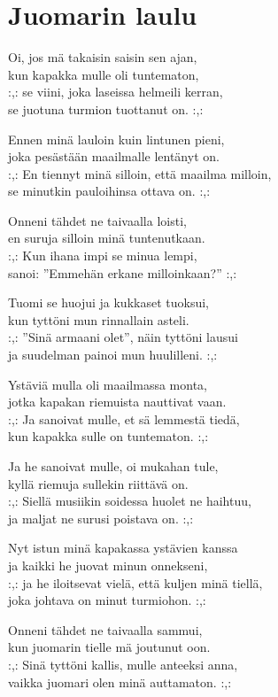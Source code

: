 \section{Juomarin laulu}

Oi, jos mä takaisin saisin sen ajan, \\
kun kapakka mulle oli tuntematon, \\
:,: se viini, joka laseissa helmeili kerran, \\
se juotuna turmion tuottanut on. :,:

Ennen minä lauloin kuin lintunen pieni, \\
joka pesästään maailmalle lentänyt on. \\
:,: En tiennyt minä silloin, että maailma milloin, \\
se minutkin pauloihinsa ottava on. :,:

Onneni tähdet ne taivaalla loisti, \\
en suruja silloin minä tuntenutkaan. \\
:,: Kun ihana impi se minua lempi, \\
sanoi: ”Emmehän erkane milloinkaan?” :,:

Tuomi se huojui ja kukkaset tuoksui, \\
kun tyttöni mun rinnallain asteli. \\
:,: ”Sinä armaani olet”, näin tyttöni lausui \\
ja suudelman painoi mun huulilleni. :,:

Ystäviä mulla oli maailmassa monta, \\
jotka kapakan riemuista nauttivat vaan. \\
:,: Ja sanoivat mulle, et sä lemmestä tiedä, \\
kun kapakka sulle on tuntematon. :,:

Ja he sanoivat mulle, oi mukahan tule, \\
kyllä riemuja sullekin riittävä on. \\
:,: Siellä musiikin soidessa huolet ne haihtuu, \\
ja maljat ne surusi poistava on. :,:

Nyt istun minä kapakassa ystävien kanssa \\
ja kaikki he juovat minun onnekseni, \\
:,: ja he iloitsevat vielä, että kuljen minä tiellä, \\
joka johtava on minut turmiohon. :,:

Onneni tähdet ne taivaalla sammui, \\
kun juomarin tielle mä joutunut oon. \\
:,: Sinä tyttöni kallis, mulle anteeksi anna, \\
vaikka juomari olen minä auttamaton. :,: